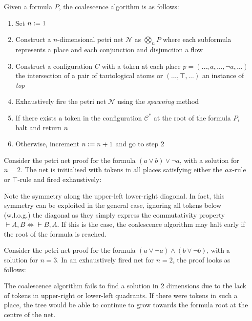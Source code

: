     \begin{definition*}[Coalescence]
        Given a formula $P$, the coalescence algorithm is as follows:
        \begin{enumerate}[nosep]
            \item Set  $n := 1$
            \item Construct a $n$-dimensional petri net $\mathcal{N}$ as $\bigotimes_n P$ where each subformula represents a place and each conjunction and disjunction a flow
            \item Construct a configuration $C$ with a token at each place $p = (\ldots, a, \ldots, \neg a, \ldots)$ the intersection of a pair of tautological atoms or $(\ldots, \top, \ldots)$ an instance of \textit{top}
            \item Exhaustively fire the petri net $\mathcal{N}$ using the \textit{spawning} method
            \item If there exists a token in the configuration $\mathcal{C^*}$ at the root of the formula $P$, halt and return $n$
            \item Otherwise, increment $n := n + 1$ and go to step 2
        \end{enumerate}
    \end{definition*}
    
    \begin{example*}
        Consider the petri net proof for the formula $(a \vee b) \vee \neg a$, with a solution for $n = 2$.
        The net is initialised with tokens in all places satisfying either the $ax$-rule or $\top$-rule and fired exhaustively:
        
    \end{example*}

    \begin{remark*}
        Note the symmetry along the upper-left lower-right diagonal.
        In fact, this symmetry can be exploited in the general case, ignoring all tokens below (w.l.o.g.) the diagonal as they simply express the commutativity property $\vdash A, B \iff \vdash B, A$.
        If this is the case, the coalescence algorithm may halt early if the root of the formula is reached.
    \end{remark*}

    \begin{example*}
        Consider the petri net proof for the formula $(a \vee \neg a) \wedge (b \vee \neg b)$, with a solution for $n = 3$.
        In an exhaustively fired net for $n = 2$, the proof looks as follows:
        
        The coalescence algorithm fails to find a solution in 2 dimensions due to the lack of tokens in upper-right or lower-left quadrants.
        If there were tokens in such a place, the tree would be able to continue to grow towards the formula root at the centre of the net.
    \end{example*}

